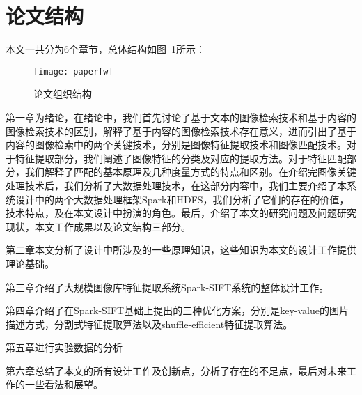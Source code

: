 \section{论文结构}
本文一共分为6个章节，总体结构如图~\ref{fig:paperfw}所示：
\begin{figure}[htp]
\centering
\texttt{[image: paperfw]}
\caption{论文组织结构}
\label{fig:paperfw}
\end{figure}

第一章为绪论，在绪论中，我们首先讨论了基于文本的图像检索技术和基于内容的图像检索技术的区别，解释了基于内容的图像检索技术存在意义，进而引出了基于内容的图像检索中的两个关键技术，分别是图像特征提取技术和图像匹配技术。对于特征提取部分，我们阐述了图像特征的分类及对应的提取方法。对于特征匹配部分，我们解释了匹配的基本原理及几种度量方式的特点和区别。在介绍完图像关键处理技术后，我们分析了大数据处理技术，在这部分内容中，我们主要介绍了本系统设计中的两个大数据处理框架Spark和HDFS，我们分析了它们的存在的价值，技术特点，及在本文设计中扮演的角色。最后，介绍了本文的研究问题及问题研究现状，本文工作成果以及论文结构三部分。

第二章本文分析了设计中所涉及的一些原理知识，这些知识为本文的设计工作提供理论基础。

第三章介绍了大规模图像库特征提取系统Spark-SIFT系统的整体设计工作。

第四章介绍了在Spark-SIFT基础上提出的三种优化方案，分别是key-value的图片描述方式，分割式特征提取算法以及shuffle-efficient特征提取算法。

第五章进行实验数据的分析

第六章总结了本文的所有设计工作及创新点，分析了存在的不足点，最后对未来工作的一些看法和展望。


